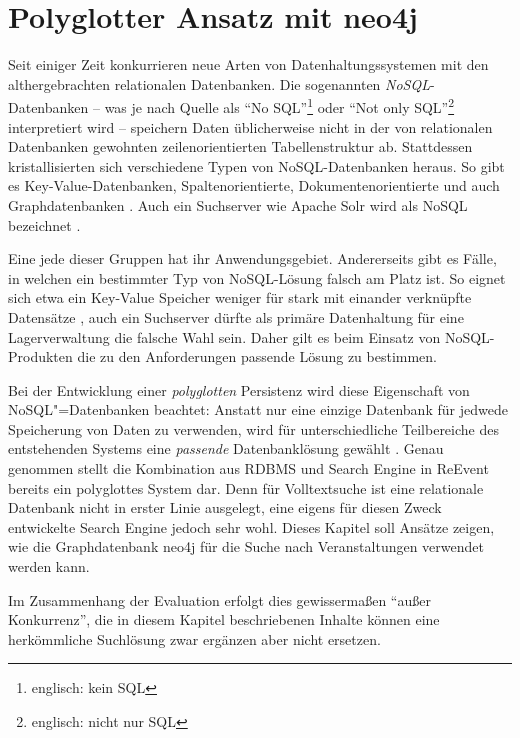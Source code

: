 
\chapter{Polyglotter Ansatz mit neo4j}
\label{ch:polyglott}

Seit einiger Zeit konkurrieren neue Arten von Datenhaltungssystemen mit den althergebrachten relationalen Datenbanken. Die sogenannten \emph{NoSQL}-Datenbanken -- was je nach Quelle als \enquote{No SQL}\footnote{englisch: kein SQL} oder \enquote{Not only SQL}\footnote{englisch: nicht nur SQL} interpretiert wird -- speichern Daten üblicherweise nicht in der von relationalen Datenbanken gewohnten zeilenorientierten Tabellenstruktur ab. Stattdessen kristallisierten sich verschiedene Typen von NoSQL-Datenbanken heraus. So gibt es Key-Value-Datenbanken, Spaltenorientierte, Dokumentenorientierte und auch Graphdatenbanken \cite[S. 307-310]{Redmond.2012}. Auch ein Suchserver wie Apache Solr wird als NoSQL bezeichnet \cite[S. 4]{Grainger.2014}.

Eine jede dieser Gruppen hat ihr Anwendungsgebiet. Andererseits gibt es Fälle, in welchen ein bestimmter Typ von NoSQL-Lösung falsch am Platz ist. So eignet sich etwa ein Key-Value Speicher weniger für stark mit einander verknüpfte Datensätze \cite[S. 308]{Redmond.2012}, auch ein Suchserver dürfte als primäre Datenhaltung für eine Lagerverwaltung die falsche Wahl sein. Daher gilt es beim Einsatz von NoSQL-Produkten die zu den Anforderungen passende Lösung zu bestimmen.

Bei der Entwicklung einer \emph{polyglotten} Persistenz wird diese Eigenschaft von NoSQL"=Datenbanken beachtet: Anstatt nur eine einzige Datenbank für jedwede Speicherung von Daten zu verwenden, wird für unterschiedliche Teilbereiche des entstehenden Systems eine \emph{passende} Datenbanklösung gewählt \cite[S. 292]{Redmond.2012}. Genau genommen stellt die Kombination aus RDBMS und Search Engine in ReEvent bereits ein polyglottes System dar. Denn für Volltextsuche ist eine relationale Datenbank nicht in erster Linie ausgelegt, eine eigens für diesen Zweck entwickelte Search Engine jedoch sehr wohl. Dieses Kapitel soll Ansätze zeigen, wie die Graphdatenbank neo4j für die Suche nach Veranstaltungen verwendet werden kann.

Im Zusammenhang der Evaluation erfolgt dies gewissermaßen \enquote{außer Konkurrenz}, die in diesem Kapitel beschriebenen Inhalte können eine herkömmliche Suchlösung zwar ergänzen aber nicht ersetzen.

